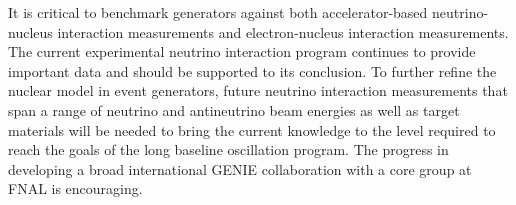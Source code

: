 It is critical to benchmark generators against both accelerator-based
neutrino-nucleus interaction measurements and electron-nucleus
interaction measurements.
The current experimental neutrino interaction program %
continues to provide important data and should be supported to its
conclusion.  To further refine the nuclear model in event generators,
future neutrino interaction measurements that span a range of neutrino
and antineutrino beam energies as well as target materials will be
needed to bring the current knowledge to the level required to reach
the goals of the long baseline oscillation program. The progress in
developing a broad international GENIE collaboration with a core group
at FNAL is encouraging.


